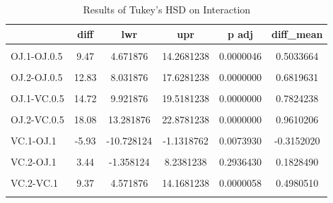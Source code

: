 \documentclass[
  11pt,
]{article}
\begin{document}
\begin{table}[!h]
\centering
\caption{\label{tab:HSD on both}Results of Tukey's HSD on Interaction}
\centering
\fontsize{10}{12}\selectfont
\begin{tabular}[t]{lccccc}
\toprule
\textbf{ } & \textbf{diff} & \textbf{lwr} & \textbf{upr} & \textbf{p adj} & \textbf{diff\_mean}\\
\midrule
\cellcolor{gray!10}{VC.0.5-OJ.0.5} & \cellcolor{gray!10}{-5.25} & \cellcolor{gray!10}{-10.048124} & \cellcolor{gray!10}{-0.4518762} & \cellcolor{gray!10}{0.0242521} & \cellcolor{gray!10}{-0.2790574}\\
OJ.1-OJ.0.5 & 9.47 & 4.671876 & 14.2681238 & 0.0000046 & 0.5033664\\
\cellcolor{gray!10}{VC.1-OJ.0.5} & \cellcolor{gray!10}{3.54} & \cellcolor{gray!10}{-1.258124} & \cellcolor{gray!10}{8.3381238} & \cellcolor{gray!10}{0.2640208} & \cellcolor{gray!10}{0.1881644}\\
OJ.2-OJ.0.5 & 12.83 & 8.031876 & 17.6281238 & 0.0000000 & 0.6819631\\
\cellcolor{gray!10}{VC.2-OJ.0.5} & \cellcolor{gray!10}{12.91} & \cellcolor{gray!10}{8.111876} & \cellcolor{gray!10}{17.7081238} & \cellcolor{gray!10}{0.0000000} & \cellcolor{gray!10}{0.6862155}\\
\addlinespace
OJ.1-VC.0.5 & 14.72 & 9.921876 & 19.5181238 & 0.0000000 & 0.7824238\\
\cellcolor{gray!10}{VC.1-VC.0.5} & \cellcolor{gray!10}{8.79} & \cellcolor{gray!10}{3.991876} & \cellcolor{gray!10}{13.5881238} & \cellcolor{gray!10}{0.0000210} & \cellcolor{gray!10}{0.4672218}\\
OJ.2-VC.0.5 & 18.08 & 13.281876 & 22.8781238 & 0.0000000 & 0.9610206\\
\cellcolor{gray!10}{VC.2-VC.0.5} & \cellcolor{gray!10}{18.16} & \cellcolor{gray!10}{13.361876} & \cellcolor{gray!10}{22.9581238} & \cellcolor{gray!10}{0.0000000} & \cellcolor{gray!10}{0.9652729}\\
VC.1-OJ.1 & -5.93 & -10.728124 & -1.1318762 & 0.0073930 & -0.3152020\\
\addlinespace
\cellcolor{gray!10}{OJ.2-OJ.1} & \cellcolor{gray!10}{3.36} & \cellcolor{gray!10}{-1.438124} & \cellcolor{gray!10}{8.1581238} & \cellcolor{gray!10}{0.3187361} & \cellcolor{gray!10}{0.1785967}\\
VC.2-OJ.1 & 3.44 & -1.358124 & 8.2381238 & 0.2936430 & 0.1828490\\
\cellcolor{gray!10}{OJ.2-VC.1} & \cellcolor{gray!10}{9.29} & \cellcolor{gray!10}{4.491876} & \cellcolor{gray!10}{14.0881238} & \cellcolor{gray!10}{0.0000069} & \cellcolor{gray!10}{0.4937987}\\
VC.2-VC.1 & 9.37 & 4.571876 & 14.1681238 & 0.0000058 & 0.4980510\\
\cellcolor{gray!10}{VC.2-OJ.2} & \cellcolor{gray!10}{0.08} & \cellcolor{gray!10}{-4.718124} & \cellcolor{gray!10}{4.8781238} & \cellcolor{gray!10}{1.0000000} & \cellcolor{gray!10}{0.0042523}\\
\bottomrule
\end{tabular}
\end{table}
\end{document}
